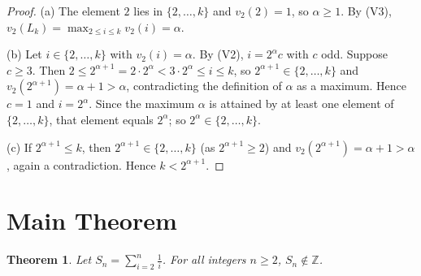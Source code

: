 \documentclass[11pt,a4paper]{article}
\newtheorem{theorem}{Theorem}
\begin{document}
\begin{proof}
(a) The element $2$ lies in $\{2,\dots,k\}$ and $v_2(2) = 1$, so $\alpha \ge 1$. By (V3), $v_2(L_k) = \max_{2\le i\le k} v_2(i) = \alpha$.

(b) Let $i \in \{2,\dots,k\}$ with $v_2(i) = \alpha$. By (V2), $i = 2^\alpha c$ with $c$ odd. Suppose $c \ge 3$. Then $2 \le 2^{\alpha+1} = 2\cdot 2^\alpha < 3\cdot 2^\alpha \le i \le k$, so $2^{\alpha+1} \in \{2,\dots,k\}$ and $v_2(2^{\alpha+1}) = \alpha+1 > \alpha$, contradicting the definition of $\alpha$ as a maximum. Hence $c = 1$ and $i = 2^\alpha$. Since the maximum $\alpha$ is attained by at least one element of $\{2,\dots,k\}$, that element equals $2^\alpha$; so $2^\alpha \in \{2,\dots,k\}$.

(c) If $2^{\alpha+1} \le k$, then $2^{\alpha+1} \in \{2,\dots,k\}$ (as $2^{\alpha+1} \ge 2$) and $v_2(2^{\alpha+1}) = \alpha+1 > \alpha$, again a contradiction. Hence $k < 2^{\alpha+1}$.
\end{proof}

\section{Main Theorem}

\begin{theorem}
Let $S_n = \sum_{i=2}^{n} \frac{1}{i}$. For all integers $n \geq 2$, $S_n \notin \mathbb{Z}$.
\end{theorem}
\end{document}
